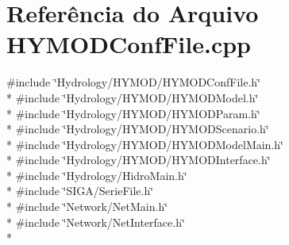 \section{Referência do Arquivo H\+Y\+M\+O\+D\+Conf\+File.\+cpp}
\label{_h_y_m_o_d_conf_file_8cpp}
{\ttfamily \#include \char`\"{}Hydrology/\+H\+Y\+M\+O\+D/\+H\+Y\+M\+O\+D\+Conf\+File.\+h\char`\"{}}\\*
{\ttfamily \#include \char`\"{}Hydrology/\+H\+Y\+M\+O\+D/\+H\+Y\+M\+O\+D\+Model.\+h\char`\"{}}\\*
{\ttfamily \#include \char`\"{}Hydrology/\+H\+Y\+M\+O\+D/\+H\+Y\+M\+O\+D\+Param.\+h\char`\"{}}\\*
{\ttfamily \#include \char`\"{}Hydrology/\+H\+Y\+M\+O\+D/\+H\+Y\+M\+O\+D\+Scenario.\+h\char`\"{}}\\*
{\ttfamily \#include \char`\"{}Hydrology/\+H\+Y\+M\+O\+D/\+H\+Y\+M\+O\+D\+Model\+Main.\+h\char`\"{}}\\*
{\ttfamily \#include \char`\"{}Hydrology/\+H\+Y\+M\+O\+D/\+H\+Y\+M\+O\+D\+Interface.\+h\char`\"{}}\\*
{\ttfamily \#include \char`\"{}Hydrology/\+Hidro\+Main.\+h\char`\"{}}\\*
{\ttfamily \#include \char`\"{}S\+I\+G\+A/\+Serie\+File.\+h\char`\"{}}\\*
{\ttfamily \#include \char`\"{}Network/\+Net\+Main.\+h\char`\"{}}\\*
{\ttfamily \#include \char`\"{}Network/\+Net\+Interface.\+h\char`\"{}}\\*
